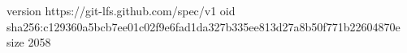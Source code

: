 version https://git-lfs.github.com/spec/v1
oid sha256:c129360a5bcb7ee01c02f9e6fad1da327b335ee813d27a8b50f771b22604870e
size 2058
